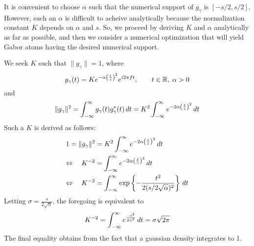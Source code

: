 It is convenient to choose $\alpha$ such that the numerical support of
$g_\gamma$ is $[-s/2,s/2]$.  
However, such an $\alpha$ is difficult to acheive analytically because
the normalization constant $K$ depends on $\alpha$ and $s$.
So, we proceed by deriving $K$ and $\alpha$ analytically as far as
possible, and then we consider a numerical optimization 
that will yield Gabor atoms having the desired numerical support.

We seek $K$ such that $\|g_\gamma\| = 1$, where
\[
g_\gamma(t) = Ke^{-\alpha \left(\frac{t}{s}\right)^2}e^{i2\pi ft},
\qquad t \in \mathbb{R},\; \alpha > 0
\]
and
\[
\|g_\gamma\|^2 = \int_{-\infty}^{\infty} g_\gamma(t)g_\gamma^*(t)\,dt
               = K^2\int_{-\infty}^{\infty}
        e^{-2\alpha\left(\frac{t}{s}\right)^2}\,dt\\ 
\]
Such a $K$ is derived as follows:
\begin{align*}
1 = \|g_\gamma\|^2 &= K^2\int_{-\infty}^{\infty}
    e^{-2\alpha\left(\frac{t}{s}\right)^2}\,dt\\ 
\Leftrightarrow \quad K^{-2} &=
\int_{-\infty}^{\infty} e^{-2\alpha\left(\frac{t}{s}\right)^2}\,dt
\\
\Leftrightarrow \quad K^{-2}
&=\int_{-\infty}^{\infty}\exp\left\{-\frac{t^2}{2(s/2\sqrt{\alpha})^2}\right\}\,dt
\end{align*}
Letting $\sigma= \frac{s}{2\sqrt{\alpha}}$, the foregoing is
equivalent to 
\[%
K^{-2} = %
\integral e^{\frac{-t^2}{2 \sigma^2}}\,dt\\
       = \sigma \sqrt{2\pi}
\]%
The final equality obtains from the fact that a gaussian density integrates to 1.
